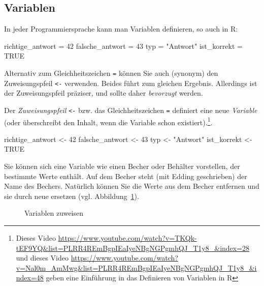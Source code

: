 \documentclass[
  a4paper,
  DIV=11]{scrreprt}
\newenvironment{Shaded}{\begin{snugshade}}{\end{snugshade}}
\newcommand{\ConstantTok}[1]{\textcolor[rgb]{0.56,0.35,0.01}{#1}}
\newcommand{\DecValTok}[1]{\textcolor[rgb]{0.68,0.00,0.00}{#1}}
\newcommand{\NormalTok}[1]{\textcolor[rgb]{0.00,0.23,0.31}{#1}}
\newcommand{\OtherTok}[1]{\textcolor[rgb]{0.00,0.23,0.31}{#1}}
\newcommand{\StringTok}[1]{\textcolor[rgb]{0.13,0.47,0.30}{#1}}
\theoremstyle{definition}
\theoremstyle{definition}
\theoremstyle{definition}
\theoremstyle{remark}
\begin{document}
\subsection{Variablen}\label{sec-rvars}

In jeder Programmiersprache kann man Variablen definieren, so auch in R:

\begin{Shaded}
\begin{Highlighting}[]
\NormalTok{richtige\_antwort }\OtherTok{=} \DecValTok{42}
\NormalTok{falsche\_antwort }\OtherTok{=} \DecValTok{43}
\NormalTok{typ }\OtherTok{=} \StringTok{"Antwort"}
\NormalTok{ist\_korrekt }\OtherTok{=} \ConstantTok{TRUE}
\end{Highlighting}
\end{Shaded}

Alternativ zum Gleichheitszeichen \texttt{=} können Sie auch (synonym)
den Zuweisungspfeil \texttt{\textless{}-} verwenden. Beides führt zum
gleichen Ergebnis. Allerdings ist der Zuweisungspfeil präziser, und
sollte daher \emph{bevorzugt} werden.

Der \emph{Zuweisungspfeil} \texttt{\textless{}-} bzw. das
Gleichheitszeichen \texttt{=} definiert eine neue \emph{Variable} (oder
überschreibt den Inhalt, wenn die Variable schon existiert).\footnote{Dieses
  Video
  \url{https://www.youtube.com/watch?v=TKQk-tEF9YQ&list=PLRR4REmBgpIEaIyeNBgNGPgmhQJ_T1y8_&index=28}
  und dieses Video
  \url{https://www.youtube.com/watch?v=Nal0m_AmMwg&list=PLRR4REmBgpIEaIyeNBgNGPgmhQJ_T1y8_&index=48}
  geben eine Einführung in das Definieren von Variablen in R}.

\begin{Shaded}
\begin{Highlighting}[]
\NormalTok{richtige\_antwort }\OtherTok{\textless{}{-}} \DecValTok{42}
\NormalTok{falsche\_antwort }\OtherTok{\textless{}{-}} \DecValTok{43}
\NormalTok{typ }\OtherTok{\textless{}{-}} \StringTok{"Antwort"}
\NormalTok{ist\_korrekt }\OtherTok{\textless{}{-}} \ConstantTok{TRUE}
\end{Highlighting}
\end{Shaded}

Sie können sich eine Variable wie einen Becher oder Behälter vorstellen,
der bestimmte Werte enthält. Auf dem Becher steht (mit Edding
geschrieben) der Name des Bechers. Natürlich können Sie die Werte aus
dem Becher entfernen und sie durch neue ersetzen (vgl.
Abbildung~\ref{fig-def-vars}).

\begin{figure}


\caption{\label{fig-def-vars}Variablen zuweisen}

\end{figure}%
\end{document}
